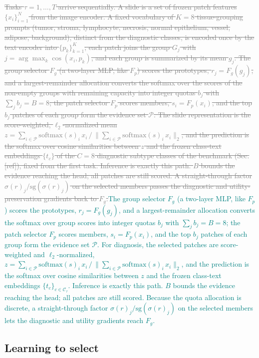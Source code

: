 \documentclass{article}
\newif\ifmarkup \markuptrue
\newcommand{\repc}[3]{\ifmarkup\textcolor{gray}{\sout{#2}}\textcolor{#1}{#3}\else#3\fi}
\newcommand{\repG}[2]{\repc{teal}{#1}{#2}}    %
\newcommand{\Fg}{F_g}
\newcommand{\Fp}{F_p}
\newcommand{\Cls}{\mathcal{C}}
\newcommand{\Psel}{\mathcal{P}}
\begin{document}
\repG{Tasks $\tau=1,\ldots,T$ arrive sequentially. A slide is a set of frozen patch features $\{x_i\}_{i=1}^{N}$ from the image encoder. A fixed vocabulary of $K=8$ tissue-grouping prompts (tumor, stroma, lymphocyte, necrosis, normal epithelium, vessel, adipose, background), distinct from the diagnostic classes, is encoded once by the text encoder into $\{p_k\}_{k=1}^{K}$; each patch joins the group $G_j$ with $j=\arg\max_k\cos(x_i,p_k)$, and each group is summarized by its mean $g_j$. The group selector $\Fg$ (a two-layer MLP, like $\Fp$) scores the prototypes, $r_j=\Fg(g_j)$, and a largest-remainder allocation converts the softmax over the scores of the non-empty groups with remaining capacity into integer quotas $b_j$ with $\sum_j b_j=B=8$; the patch selector $\Fp$ scores members, $s_i=\Fp(x_i)$, and the top $b_j$ patches of each group form the evidence set $\Psel$. The slide representation is the score-weighted, $\ell_2$-normalized mean $z=\sum_{i\in\Psel}\mathrm{softmax}(s)_i\,x_i\,/\,\bigl\|\sum_{i\in\Psel}\mathrm{softmax}(s)_i\,x_i\bigr\|_2$, and the prediction is the softmax over cosine similarities between $z$ and the frozen class-text embeddings $\{t_c\}$ of the $C=8$ diagnostic subtype classes of the benchmark (Sec. [ref]), fixed from the first task. Inference is exactly this path. $B$ bounds the evidence reaching the head; all patches are still scored. A straight-through factor $\sigma(r)_j/\mathrm{sg}(\sigma(r)_j)$ on the selected members passes the diagnostic and utility-preservation gradients back to $\Fg$.}{The group selector $\Fg$ (a two-layer MLP, like $\Fp$) scores the prototypes, $r_j=\Fg(g_j)$, and a largest-remainder allocation converts the softmax over group scores into integer quotas $b_j$ with $\sum_j b_j=B=8$; the patch selector $\Fp$ scores members, $s_i=\Fp(x_i)$, and the top $b_j$ patches of each group form the evidence set $\Psel$. For diagnosis, the selected patches are score-weighted and $\ell_2$-normalized, $z=\sum_{i\in\Psel}\mathrm{softmax}(s)_i\,x_i\,/\,\bigl\|\sum_{i\in\Psel}\mathrm{softmax}(s)_i\,x_i\bigr\|_2$, and the prediction is the softmax over cosine similarities between $z$ and the frozen class-text embeddings $\{t_c\}_{c\in\Cls_\tau}$. Inference is exactly this path. $B$ bounds the evidence reaching the head; all patches are still scored. Because the quota allocation is discrete, a straight-through factor $\sigma(r)_j/\mathrm{sg}(\sigma(r)_j)$ on the selected members lets the diagnostic and utility gradients reach $\Fg$.}

\subsection{Learning to select}
\label{ssec:within}
\end{document}
